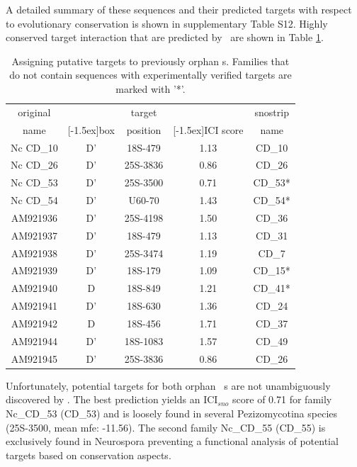 A detailed summary of these sequences and their predicted targets with
respect to evolutionary conservation is shown in supplementary Table
S12. Highly conserved target interaction that are predicted by
\snostrip\ are shown in Table \ref{tab:orphan_cd_snoRNAs_short}.

\begin{table}
  \caption{Assigning putative targets to previously
    orphan \cd s. Families that do not contain sequences with
    experimentally verified targets are marked with '*'. }
  \label{tab:orphan_cd_snoRNAs_short}
  \begin{center}
    \begin{footnotesize}
      \begin{tabular}{c|c|c|c|c}
      original&&target&&snostrip\\
      name&\raisebox{1.5ex}[-1.5ex]{box}&position&\raisebox{1.5ex}[-1.5ex]{ICI
      score}&name\\
  \hline
  Nc CD\_10&D'&18S-479&1.13&CD\_10\\
\hline
  Nc CD\_26&D'&25S-3836&0.86&CD\_26\\
\hline
  Nc CD\_53&D'&25S-3500&0.71&CD\_53*\\
\hline
  Nc CD\_54&D'&U60-70&1.43&CD\_54*\\
 \hline
  AM921936&D'&25S-4198&1.50&CD\_36\\
\hline
  AM921937&D'&18S-479&1.13&CD\_31\\
\hline
  AM921938&D'&25S-3474&1.19&CD\_7\\
\hline
  AM921939&D'&18S-179&1.09&CD\_15*\\
\hline
  AM921940&D&18S-849&1.21&CD\_41*\\
\hline
  AM921941&D'&18S-630&1.36&CD\_24\\
\hline
  AM921942&D&18S-456&1.71&CD\_37\\
\hline
  AM921944&D'&18S-1083&1.57&CD\_49\\
\hline
  AM921945&D'&25S-3836&0.86&CD\_26\\

    \end{tabular}
    \end{footnotesize}
  \end{center} 
\end{table}

Unfortunately, potential targets for both orphan \ncr\ \sno s are not
unambiguously discovered by \snostrip. The best prediction yields an
ICI$_{sno}$ score of 0.71 for family Nc\_CD\_53 (CD\_53) and is
loosely found in several Pezizomycotina species (25S-3500, mean mfe:
-11.56). The second family Nc\_CD\_55 (CD\_55) is exclusively found in
Neurospora preventing a functional analysis of potential targets based
on conservation aspects.

